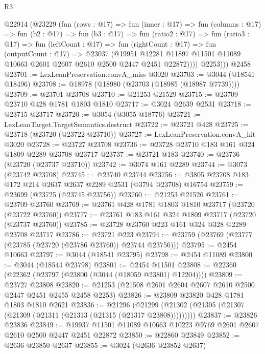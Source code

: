 \begin{lexlean}{R3}
\begin{coremodule}
        @22914
          (@23229
            (fun (rows : @17) =>
            fun (inner : @17) =>
            fun (columns : @17) =>
            fun (b2 : @17) =>
            fun (b3 : @17) =>
            fun (ratio2 : @17) =>
            fun (ratio3 : @17) =>
            fun (leftCount : @17) =>
            fun (rightCount : @17) =>
            fun (outputCount : @17) =>
            @23037
              (@19951
                @12281
                @11897
                @11501
                @11089
                @10663
                @2601
                @2607
                @2610
                @2500
                @2447
                @2451
                @22872))))
          @2253)))
    @2458
@23701 := LexLeanPreservation.convA_miss @3020
@23703 := @3044 (@18541 @18496)
@23708 := @18978 (@18980 (@23703 (@18985 (@18987 @7739))))
@23709 := @23701 @23708
@23710 := @21253 @21529
@23715 := @23709 @23710 @428 @1781 @1803 @1810
@23717 := @3024 @2639 @2531
@23718 := @23715 @23717
@23720 := @3054 (@3055 @18776)
@23721 := LexLeanTarget.TargetSemantics.destruct
@23722 := @23721 @428
@23725 := @23718 (@23720 (@23722 @23710))
@23727 := LexLeanPreservation.convA_hit @3020
@23728 := @23727 @23708
@23736 := @23728 @23710 @183 @161 @324 @1809 @2289 @23708 @23717
@23737 := @23721 @183
@23740 := @23736 (@23720 (@23737 @23710))
@23742 := @3074 @161 @2289
@23744 := @3073 (@23742 @23708)
@23745 := @23740 @23744
@23756 := @3805 @23708 @183 @172 @214 @2637 @2637 @2289 @2531 (@3794 @23708) @16754
@23759 := @23699 (@23725 (@23745 @23756))
@23760 := @21253 @21526
@23761 := @23709 @23760
@23769 := @23761 @428 @1781 @1803 @1810 @23717 (@23720 (@23722 @23760))
@23777 := @23761 @183 @161 @324 @1809 @23717 (@23720 (@23737 @23760))
@23785 := @23728 @23760 @223 @161 @324 @328 @2289 @23708 @23717
@23786 := @23721 @223
@23794 := @23759 (@23769 (@23777 (@23785 (@23720 (@23786 @23760)) @23744 @23756)))
@23795 := @2454 @10663
@23797 := @3044 (@18541 @23795)
@23798 := @2454 @11089
@23800 := @3044 (@18544 @23798)
@23801 := @2454 @11501
@23808 := @22360 (@22362 (@23797 (@23800 (@3044 (@18059 @23801) @12204))))
@23809 := @23727 @23808
@23820 := @21253 (@21508 @2601 @2604 @2607 @2610 @2500 @2447 @2451 @2455 @2458 @2253)
@23826 := @23809 @23820 @428 @1781 @1803 @1810 @2621
@23836 := @21296
    (@21299 (@21302 (@21305 (@21307 (@21309 (@21311 (@21313 (@21315 (@21317 @23808)))))))))
@23837 := @23826 @23836
@23849 := @19937 @11501 @11089 @10663 @10223 @9769 @2601 @2607 @2610 @2500 @2447 @2451 @22872
@23850 := @22860 @23849
@23852 := @2636 @23850 @2637
@23855 := @3024 (@2636 @23852 @2637)

\end{coremodule}
\end{lexlean}

